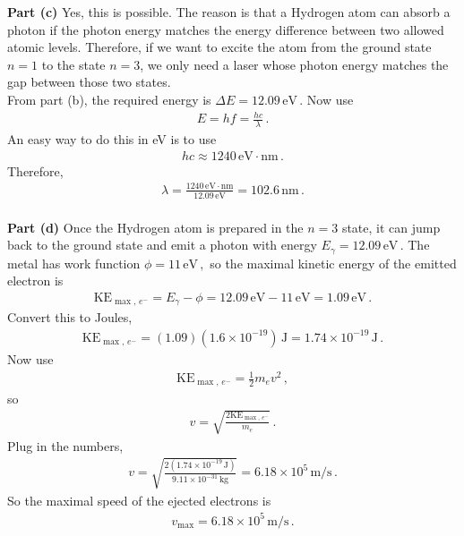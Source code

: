 \documentclass[11pt]{article}
\begin{document}
\noindent\textbf{Part (c)} Yes, this is possible. The reason is that a Hydrogen atom can absorb a photon if the photon energy matches the energy difference between two allowed atomic levels. Therefore, if we want to excite the atom from the ground state $n=1$ to the state $n=3$, we only need a laser whose photon energy matches the gap between those two states.\\

From part (b), the required energy is
$\Delta E = 12.09\,\text{eV}\,.$ Now use
\begin{align*}
E = hf = \frac{hc}{\lambda}\,.
\end{align*}
An easy way to do this in eV is to use
\begin{align*}
hc \approx 1240\,\text{eV}\cdot\text{nm}\,.
\end{align*}
Therefore,
\begin{align*}
\lambda = \frac{1240\,\text{eV}\cdot\text{nm}}{12.09\,\text{eV}}
= 102.6\,\text{nm}\,.\\
\end{align*}


\noindent\textbf{Part (d)} Once the Hydrogen atom is prepared in the $n=3$ state, it can jump back to the ground state and emit a photon with energy
$E_{\gamma} = 12.09\,\text{eV}\,.$
The metal has work function $
\phi = 11\,\text{eV}\,,$
so the maximal kinetic energy of the emitted electron is
\begin{align*}
\text{KE}_{\max,\,e^-} = E_{\gamma} - \phi = 12.09\,\text{eV} - 11\,\text{eV} = 1.09\,\text{eV}\,.
\end{align*}
Convert this to Joules,
\begin{align*}
\text{KE}_{\max,\,e^-} = (1.09)(1.6\times 10^{-19})\,\text{J}
= 1.74\times 10^{-19}\,\text{J}\,.
\end{align*}
Now use
\begin{align*}
\text{KE}_{\max,\,e^-} = \frac{1}{2}m_ev^2\,,
\end{align*}
so
\begin{align*}
v = \sqrt{\frac{2\text{KE}_{\max,\,e^-}}{m_e}}\,.
\end{align*}
Plug in the numbers,
\begin{align*}
v = \sqrt{\frac{2(1.74\times 10^{-19}\,\text{J})}{9.11\times 10^{-31}\,\text{kg}}}
= 6.18\times 10^5\,\text{m/s}\,.
\end{align*}
So the maximal speed of the ejected electrons is
\begin{align*}
v_{\max} = 6.18\times 10^5\,\text{m/s}\,.\\
\end{align*}
\end{document}
